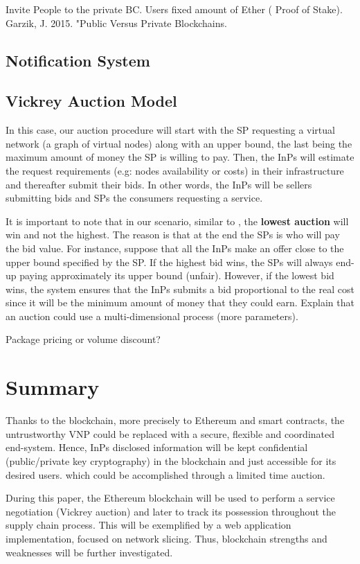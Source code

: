 Invite People to the private BC. Users fixed amount of Ether ( Proof of Stake). Garzik, J. 2015. "Public Versus Private Blockchains.

\subsection{Notification System}


\subsection{Vickrey Auction Model}

In this case, our auction procedure will start with the SP requesting a virtual network (a graph of virtual nodes) along with an upper bound, the last being the maximum amount of money the SP is willing to pay. Then, the InPs will estimate the request requirements (e.g: nodes availability or costs) in their infrastructure and thereafter submit their bids. In other words, the InPs will be sellers submitting bids and SPs the consumers requesting a service.

It is important to note that in our scenario, similar to \citep{zaheer2010multi}, the \textbf{lowest auction} will win and not the highest. The reason is that at the end the SPs is who will pay the bid value. For instance, suppose that all the InPs make an offer close to the upper bound specified by the SP. If the highest bid wins, the SPs will always end-up paying approximately its upper bound (unfair). However, if the lowest bid wins, the system ensures that the InPs submits a bid proportional to the real cost since it will be the minimum amount of money that they could earn.
Explain that an auction could use a multi-dimensional process (more parameters).

Package pricing or volume discount?


\section{Summary}

Thanks to the blockchain, more precisely to Ethereum and smart contracts, the untrustworthy VNP could be replaced with a secure, flexible and coordinated end-system. Hence, InPs disclosed information will be kept confidential (public/private key cryptography) in the blockchain and just accessible for its desired users. which could be accomplished through a limited time auction.

During this paper, the Ethereum blockchain will be used to perform a service negotiation (Vickrey auction) and later to track its possession throughout the supply chain process. This will be exemplified by a web application implementation, focused on network slicing. Thus, blockchain strengths and weaknesses will be further investigated.

